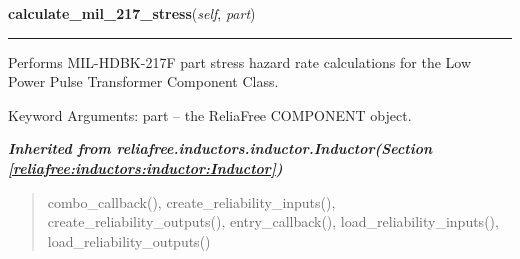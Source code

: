 \hspace{.8\funcindent}\begin{boxedminipage}{\funcwidth}

    \raggedright \textbf{calculate\_mil\_217\_stress}(\textit{self}, \textit{part})

    \vspace{-1.5ex}

    \rule{\textwidth}{0.5\fboxrule}
\setlength{\parskip}{2ex}
    Performs MIL-HDBK-217F part stress hazard rate calculations for the Low
    Power Pulse Transformer Component Class.

    Keyword Arguments: part -- the ReliaFree COMPONENT object.

\setlength{\parskip}{1ex}
    \end{boxedminipage}


\large{\textbf{\textit{Inherited from reliafree.inductors.inductor.Inductor\textit{(Section \ref{reliafree:inductors:inductor:Inductor})}}}}

\begin{quote}
combo\_callback(), create\_reliability\_inputs(), create\_reliability\_outputs(), entry\_callback(), load\_reliability\_inputs(), load\_reliability\_outputs()
\end{quote}
